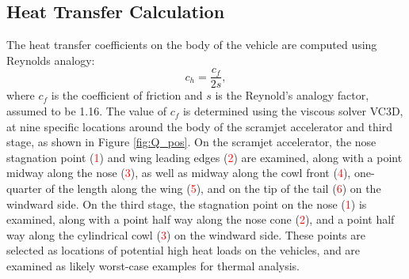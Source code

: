\subsection{Heat Transfer Calculation}
The heat transfer coefficients on the body of the vehicle are computed using Reynolds analogy: 
\begin{equation}
c_h = \frac{c_f}{2s},
\end{equation}
where $c_f$ is the coefficient of friction and $s$ is the Reynold's analogy factor, assumed to be 1.16\cite{Ward2018}. 
The value of $c_f$ is determined using the viscous solver VC3D, at nine specific locations around the body of the scramjet accelerator and third stage, as shown in Figure \ref{fig:Q_pos}. On the scramjet accelerator, the nose stagnation point (\textcolor{red}{1}) and wing leading edges (\textcolor{red}{2}) are examined, along with a point midway along the nose (\textcolor{red}{3}), as well as midway along the cowl front (\textcolor{red}{4}), one-quarter of the length along the wing (\textcolor{red}{5}), and on the tip of the tail (\textcolor{red}{6}) on the windward side. On the third stage, the stagnation point on the nose (\textcolor{red}{1}) is examined, along with a point half way along the nose cone (\textcolor{red}{2}), and a point half way along the cylindrical cowl (\textcolor{red}{3}) on the windward side. These points are selected as locations of potential high heat loads on the vehicles, and are examined as likely worst-case examples for thermal analysis. 

